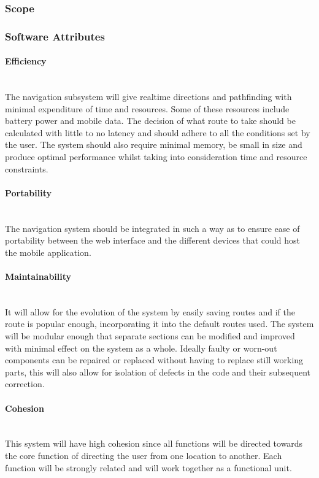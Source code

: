 \subsubsection{Scope}


\subsubsection{Software Attributes}

	\paragraph{Efficiency}
	\mbox{}\\
	The navigation subsystem will give realtime directions and pathfinding with minimal 
	expenditure of time and resources. Some of these resources include battery power and mobile 
	data. The decision of what route to take should be calculated with little to no latency and 
	should adhere to all the conditions set by the user. The system should also require minimal 
	memory, be small in size and produce optimal performance whilst taking into consideration 
	time and resource constraints.

	\paragraph{Portability}
	\mbox{}\\
	The navigation system should be integrated in such a way as to ensure ease of portability
	 between the web interface and the different devices that could host the mobile application. 

	\paragraph{Maintainability}
	\mbox{}\\
	It will allow for the evolution of the system by easily saving routes and if the route is 
	popular enough, incorporating it into the default routes used. The system will be modular
	 enough that separate sections can be modified and improved with minimal effect on the 
	 system as a whole. Ideally faulty or worn-out components can be repaired or replaced
	  without having to replace still working parts, this will also allow for isolation of
	  defects in the code and their subsequent correction.
	
	\paragraph{Cohesion}
	\mbox{}\\
	This system will have high cohesion since all functions will be directed towards the core
	 function of directing the user from one location to another. Each function will be
	  strongly related and will work together as a functional unit.
	  
